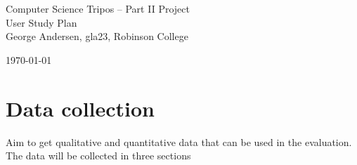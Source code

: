 \documentclass[12pt,a4paper,twoside]{article}
\begin{document}
\begin{center}
\Large
Computer Science Tripos -- Part II Project\\[4mm]
\LARGE
User Study Plan \\[4mm]

\large
George Andersen, gla23, Robinson College

\today

\end{center}

\vspace{5mm}

\section*{Data collection}
Aim to get qualitative and quantitative data that can be used in the evaluation.
The data will be collected in three sections
\end{document}
